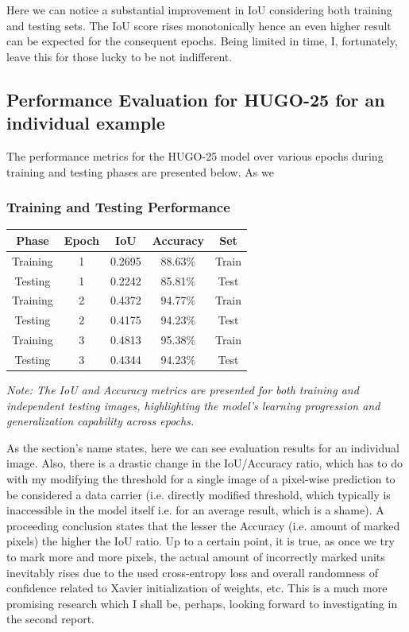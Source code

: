 \documentclass[12pt,a4paper]{article}
\begin{document}
\vspace{3mm}

Here we can notice a substantial improvement in IoU considering both training and testing sets. The IoU score rises monotonically hence an even higher result can be expected for the consequent epochs. Being limited in time, I, fortunately, leave this for those lucky to be not indifferent.

\subsection{Performance Evaluation for HUGO-25 for an individual example}

The performance metrics for the HUGO-25 model over various epochs during training and testing phases are presented below.
As we 

\subsubsection{Training and Testing Performance}
\begin{tabular}{|c|c|c|c|c|}
\hline
\textbf{Phase} & \textbf{Epoch} & \textbf{IoU} & \textbf{Accuracy} & \textbf{Set} \\
\hline
Training & 1 & 0.2695 & 88.63\% & Train \\
Testing & 1 & 0.2242 & 85.81\% & Test \\
Training & 2 & 0.4372 & 94.77\% & Train \\
Testing & 2 & 0.4175 & 94.23\% & Test \\
Training & 3 & 0.4813 & 95.38\% & Train \\
Testing & 3 & 0.4344 & 94.23\% & Test \\
\hline
\end{tabular}

\vspace{2mm}
\textit{Note: The IoU and Accuracy metrics are presented for both training and independent testing images, highlighting the model's learning progression and generalization capability across epochs.}

\vspace{2mm}

As the section's name states, here we can see evaluation results for an individual image.
Also, there is a drastic change in the IoU/Accuracy ratio, which has to do with my modifying the threshold for a single image of a pixel-wise prediction to be considered a data carrier (i.e. directly modified threshold, which typically is inaccessible in the model itself i.e. for an average result, which is a shame).
A proceeding conclusion states that the lesser the Accuracy (i.e. amount of marked pixels) the higher the IoU ratio. Up to a certain point, it is true, as once we try to mark more and more pixels, the actual amount of incorrectly marked units inevitably rises due to the used cross-entropy loss and overall randomness of confidence related to Xavier initialization of weights, etc. This is a much more promising research which I shall be, perhaps, looking forward to investigating in the second report.
\end{document}
